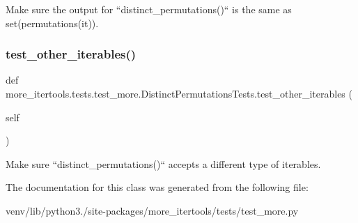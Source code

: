 \begin{DoxyVerb}Make sure the output for ``distinct_permutations()`` is the same as
set(permutations(it)).\end{DoxyVerb}
 \mbox{\label{classmore__itertools_1_1tests_1_1test__more_1_1_distinct_permutations_tests_a004b268104d5321c571d6fc592949ea5}} 
\subsubsection{\texorpdfstring{test\+\_\+other\+\_\+iterables()}{test\_other\_iterables()}}
{\footnotesize\ttfamily def more\+\_\+itertools.\+tests.\+test\+\_\+more.\+Distinct\+Permutations\+Tests.\+test\+\_\+other\+\_\+iterables (\begin{DoxyParamCaption}\item[{}]{self }\end{DoxyParamCaption})}

\begin{DoxyVerb}Make sure ``distinct_permutations()`` accepts a different type of
iterables.\end{DoxyVerb}
 

The documentation for this class was generated from the following file\+:\begin{DoxyCompactItemize}
\item 
venv/lib/python3./site-\/packages/more\+\_\+itertools/tests/test\+\_\+more.\+py\end{DoxyCompactItemize}
